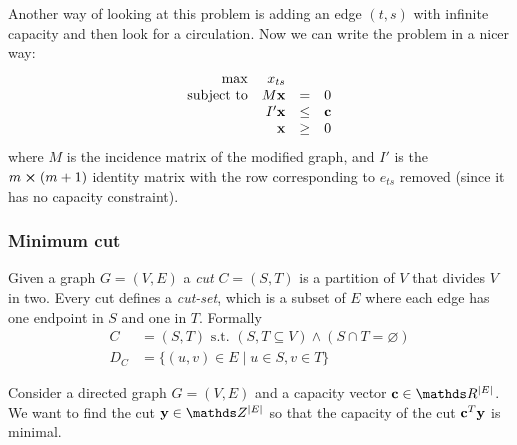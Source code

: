 \documentclass[12pt]{extarticle}
\renewcommand{\vec}[1]{\bvec{#1}}
\begin{document}
Another way of looking at this problem is adding an edge $(t, s)$ with infinite capacity and then
look for a circulation. Now we can write the problem in a nicer way:
\begin{equation}
	\begin{array}{rrcl}
		\max              & x_{ts}    &      &        \\
		\text{subject to} & M \vec x  & =    & 0      \\
		                  & I' \vec x & \leq & \vec c \\
		                  & \vec x    & \geq & 0
	\end{array}
	\label{eq:st-flow-mod}
\end{equation}
where $M$ is the incidence matrix of the modified graph, and $I'$ is the $m\cross (m + 1)$ identity
matrix with the row corresponding to $e_{ts}$ removed (since it has no capacity constraint).

\subsubsection{Minimum cut}

Given a graph $G = (V, E)$ a \emph{cut} $C = (S, T)$ is a partition of $V$ that divides $V$ in two.
Every cut defines a \emph{cut-set}, which is a subset of $E$ where each edge has one endpoint in $S$
and one in $T$.
Formally
\begin{align}
	C   & = (S, T) \text{ s.t. } (S, T \subseteq V) \land (S \cap T = \varnothing) \\
	D_C & = \{ (u, v) \in E \mid u \in S, v \in T \}
\end{align}

Consider a directed graph $G = (V, E)$ and a capacity vector $\vec c \in \R^{\abs{E}}$.
We want to find the cut $\vec y \in \Z^\abs{E}$ so that the capacity of the cut $\vec c^T \vec y$ is
minimal.
\end{document}
